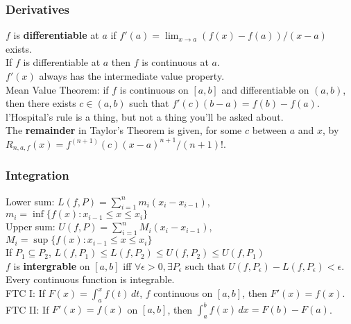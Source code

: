 \documentclass[letterpaper,8pt,landscape]{article}
\begin{document}
\begin{multicols}{2}
\subsubsection*{Derivatives}
$f$ is {\bf differentiable} at $a$ if $f'(a)=\lim_{x\to a}(f(x)-f(a))/(x-a)$ exists.\\
If $f$ is differentiable at $a$ then $f$ is continuous at $a$.\\
$f'(x)$ always has the intermediate value property.\\
Mean Value Theorem: if $f$ is continuous on $[a,b]$ and differentiable on $(a,b)$, then there exists $c\in (a,b)$ such that $f'(c)(b-a) = f(b)-f(a)$.\\
l'Hospital's rule is a thing, but not a thing you'll be asked about.\\
The {\bf remainder} in Taylor's Theorem is given, for some $c$ between $a$ and $x$, by $R_{n,a,f}(x) = f^{(n+1)}(c)(x-a)^{n+1}/(n+1)!$.

\subsubsection*{Integration}
Lower sum: $L(f,P) = \sum_{i=1}^n m_i(x_i-x_{i-1})$, $m_i = \inf\{f(x) : x_{i-1}\leq x\leq x_i\}$\\
Upper sum: $U(f,P) = \sum_{i=1}^n M_i(x_i-x_{i-1})$, $M_i = \sup\{f(x) : x_{i-1}\leq x\leq x_i\}$\\
If $P_1\subseteq P_2$, $L(f,P_1)\leq L(f,P_2)\leq U(f,P_2)\leq U(f,P_1)$\\
$f$ is {\bf intergrable} on $[a,b]$ iff $\forall \epsilon>0, \exists P_\epsilon$ such that $U(f,P_\epsilon)-L(f,P_\epsilon)<\epsilon$.\\
Every continuous function is integrable.\\
FTC I: If $F(x) = \int_a^x f(t)\,dt$, $f$ continuous on $[a,b]$, then $F'(x) = f(x)$.\\
FTC II: If $F'(x) = f(x)$ on $[a,b]$, then $\int_a^b f(x)\, dx = F(b)-F(a)$.
\end{multicols}
\end{document}
